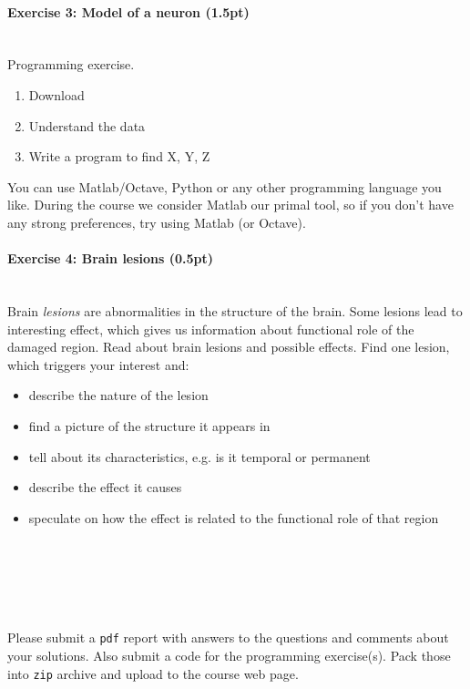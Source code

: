 \documentclass[a4paper,11pt]{article}
\newenvironment{exercise}[3]{\paragraph{Exercise #1: #2 (#3pt)}\ \\}{
\medskip}
\begin{document}
\begin{exercise}{3}{Model of a neuron}{1.5}
Programming exercise.
\begin{enumerate}
\itemsep 0em
	\item Download
	\item Understand the data
	\item Write a program to find X, Y, Z
\end{enumerate}
You can use Matlab/Octave, Python or any other programming language you like. During the course we consider Matlab our primal tool, so if you don't have any strong preferences, try using Matlab (or Octave).
\end{exercise}

\begin{exercise}{4}{Brain lesions}{0.5}
Brain \emph{lesions} are abnormalities in the structure of the brain. Some lesions lead to interesting effect, which gives us information about functional role of the damaged region. Read about brain lesions and possible effects. Find one lesion, which triggers your interest and:
\begin{itemize}
\itemsep 0em
	\item describe the nature of the lesion
	\item find a picture of the structure it appears in
	\item tell about its characteristics, e.g. is it temporal or permanent
	\item describe the effect it causes
	\item speculate on how the effect is related to the functional role of that region
\end{itemize}
\end{exercise}

\ \\
\ \\
\ \\
\ \\
\ \\
Please submit a \texttt{pdf} report with answers to the questions and comments about your solutions. Also submit a code for the programming exercise(s). Pack those into \texttt{zip} archive and upload to the course web page.
\end{document}

